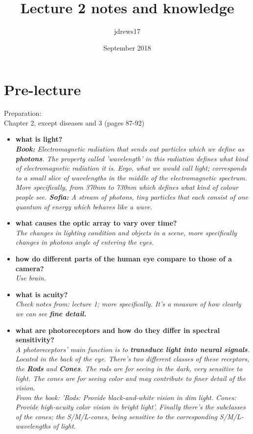 \documentclass{article}
\title{Lecture 2 notes and knowledge}
\author{jdrews17}
\date{September 2018}
\begin{document}
\maketitle
\newpage

\section{Pre-lecture}
Preparation:\\
Chapter 2, except diseases and 3 (pages 87-92)
\begin{itemize}
  \item \textbf{what is light?}\\
    \textit{\textbf{Book:} Electromagnetic radiation that sends out particles which we define as \textbf{photons}. The property called 'wavelength' in this radiation defines what kind of electromagnetic radiation it is. Ergo, what we would call light; corresponds to a small slice of wavelengths in the middle of the electromagnetic spectrum. More specifically, from 370nm to 730nm which defines what kind of colour people see. \textbf{Sofia:} A stream of photons, tiny particles that each consist of one quantum of energy which behaves like a wave.}
    \item \textbf{what causes the optic array to vary over time?}\\
      \textit{The changes in lighting condition and objects in a scene, more specifically changes in photons angle of entering the eyes.}
    \item \textbf{how do different parts of the human eye compare to those of a camera?}\\
      \textit{Use brain.}
    \item \textbf{what is acuity?}\\
      \textit{Check notes from: lecture 1; more specifically. It's a measure of how clearly we can see \textbf{fine detail.}}
    \item \textbf{what are photoreceptors and how do they differ in spectral sensitivity?}\\
      \textit{A photoreceptors' main function is to \textbf{transduce light into neural signals}. Located in the back of the eye. There's two different classes of these receptors, the \textbf{Rods} and \textbf{Cones}. The rods are for seeing in the dark, very sensitive to light. The cones are for seeing color and may contribute to finer detail of the vision.\\ From the book: 'Rods: Provide black-and-white vision in dim light. Cones: Provide high-acuity color vision in bright light'. Finally there's the subclasses of the cones; the S/M/L-cones, being sensitive to the corresponding S/M/L-wavelengths of light.}

\end{itemize}
\end{document}
